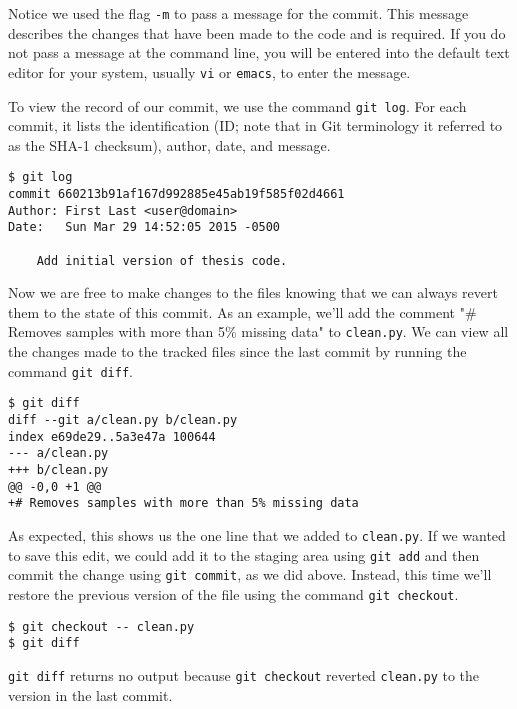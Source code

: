 Notice we used the flag \verb|-m| to pass a message for the commit.
This message describes the changes that have been made to the code and is required.
If you do not pass a message at the command line, you will be entered into the default text editor for your system, usually \verb|vi| or \verb|emacs|, to enter the message.

To view the record of our commit, we use the command \verb|git log|.
For each commit, it lists the identification (ID; note that in Git terminology it referred to as the SHA-1 checksum), author, date, and message.

\begin{lstlisting}
$ git log
commit 660213b91af167d992885e45ab19f585f02d4661
Author: First Last <user@domain>
Date:   Sun Mar 29 14:52:05 2015 -0500

    Add initial version of thesis code.
\end{lstlisting}

Now we are free to make changes to the files knowing that we can always revert them to the state of this commit.
As an example, we'll add the comment "# Removes samples with more than 5\% missing data" to \verb|clean.py|.
We can view all the changes made to the tracked files since the last commit by running the command \verb|git diff|.

\begin{lstlisting}
$ git diff
diff --git a/clean.py b/clean.py
index e69de29..5a3e47a 100644
--- a/clean.py
+++ b/clean.py
@@ -0,0 +1 @@
+# Removes samples with more than 5% missing data
\end{lstlisting}

As expected, this shows us the one line that we added to \verb|clean.py|.
If we wanted to save this edit, we could add it to the staging area using \verb|git add| and then commit the change using \verb|git commit|, as we did above.
Instead, this time we'll restore the previous version of the file using the command \verb|git checkout|.

\begin{lstlisting}
$ git checkout -- clean.py
$ git diff
\end{lstlisting}

\verb|git diff| returns no output because \verb|git checkout| reverted \verb|clean.py| to the version in the last commit.